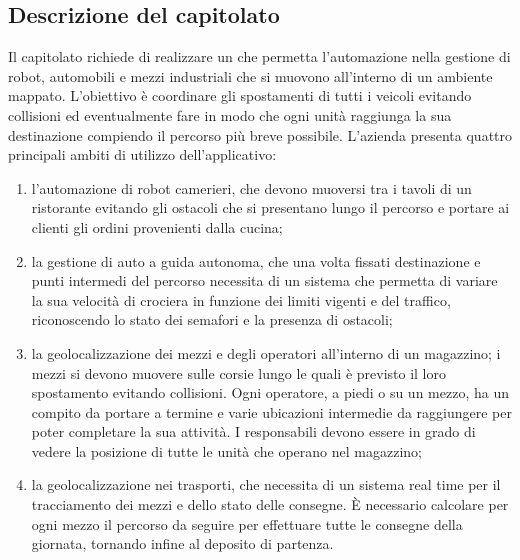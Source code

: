 \subsection{Descrizione del capitolato}
Il capitolato richiede di realizzare un    che permetta l’automazione nella gestione di robot, automobili e mezzi industriali che si muovono all’interno di un ambiente mappato. L’obiettivo è coordinare gli spostamenti di tutti i veicoli evitando collisioni ed eventualmente fare in modo che ogni unità raggiunga la sua destinazione compiendo il percorso più breve possibile.
L’azienda presenta quattro principali ambiti di utilizzo dell’applicativo:
\begin{enumerate}
    \item l’automazione di robot camerieri, che devono muoversi tra i tavoli di un ristorante evitando gli ostacoli che si presentano lungo il percorso e portare ai clienti gli ordini provenienti dalla cucina;
    \item la gestione di auto a guida autonoma, che una volta fissati destinazione e punti intermedi del percorso necessita di un sistema che permetta di variare la sua velocità di crociera in funzione dei limiti vigenti e del traffico, riconoscendo lo stato dei semafori e la presenza di ostacoli;
    \item la geolocalizzazione dei mezzi e degli operatori all’interno di un magazzino; i mezzi si devono muovere sulle corsie lungo le quali è previsto il loro spostamento evitando collisioni. Ogni operatore, a piedi o su un mezzo, ha un compito da portare a termine e varie ubicazioni intermedie da raggiungere per poter completare la sua attività. I responsabili devono essere in grado di vedere la posizione di tutte le unità che operano nel magazzino;
    \item la geolocalizzazione nei trasporti, che necessita di un sistema real time per il tracciamento dei mezzi e dello stato delle consegne. È necessario calcolare per ogni mezzo il percorso da seguire per effettuare tutte le consegne della giornata, tornando infine al deposito di partenza.
\end{enumerate}

